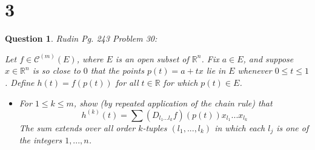 \documentclass{article}
\newtheorem{question}{Question}
\begin{document}
\section*{3}
\begin{myBox}[]{}
    \begin{question}
        Rudin Pg. 243 Problem 30:

        Let $f\in \mathcal{C}^{(m)}(E)$, where $E$ is an open subset of $\mathbb{R}^n$. Fix $a\in E$, and suppose $x\in\mathbb{R}^n$ is so close to $0$ that the points $p(t)=a+tx$ lie in $E$ whenever $0\leq t\leq 1$. Define $h(t)=f(p(t))$ for all $t\in\mathbb{R}$ for which $p(t)\in E$.
        \begin{itemize}
            \item[(a)] For $1\leq k\leq m$, show (by repeated application of the chain rule) that 
            $$h^{(k)}(t)=\sum (D_{l_1...l_k}f)(p(t))x_{l_1}...x_{l_k}$$
            The sum extends over all order $k$-tuples $(l_1,...,l_k)$ in which each $l_j$ is one of the integers $1,...,n$.
            \begin{comment}
            \item[(b)] By Taylor's Theorem:
            $$h(1)=\sum_{k=0}^{m-1}\frac{h^{(k)}(0)}{k!}+\frac{h^{(m)}(t)}{m!}$$
            for some $t\in (0,1)$. Use this to prove Taylor's Theorem in $n$ variables by showing that the formula 
            $$f(a+x)=\sum_{k=0}^{m-1}\frac{1}{k!}\left(\sum(D_{l_1...l_k}f)(a)x_{l_1}...x_{l_k}\right)+r(x)$$
            represents $f(a+x)$ as the sum of its so-called "Taylor polynomial of degree $m-1$" plus a remainder that satisfies 
            $$\lim_{x\rightarrow 0}\frac{r(x)}{|x|^{m-1}}=0$$
            Each of the inner sums extends over all ordered $k$-tuples $(l_1,...,l_k)$, as in part (a); as usual, the zero-order derivative of $f$ is simply $f$, so that the constant term of the Taylor polynomial of $f$ at $a$ is $f(a)$.
            \item[(c)] Exercise $29$ shows that repetition occurs in the Taylor polynomial as written in part (b). For instance, $D_{113}$ occurs three times, as $D_{113}, D_{131}, D_{311}$. The sum of the corresponding three terms can be written in the form 
            $$3(D_1^2D_3f)(a)x_1^2x_3$$
            Prove (by calculating how often each derivative occurs) that the Taylor polynomial in (b) can be written in the form 
            $$\sum\frac{(D_1^{s_1}...D_n^{s_n}f)(a)}{s_1!...s_n!}x_1^{s_1}...x_n^{s_n}$$
            Here the summation extends over all ordered $n$-tuples $(s_1,...,s_n)$ such that each $s_i$ is a nonnegative integer and $s_1+...+s_n\leq m-1$.
            \end{comment}
        \end{itemize}
    \end{question}
\end{myBox}
\end{document}
